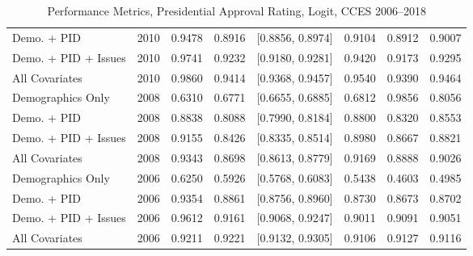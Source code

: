 \begin{table}[ht]
\begin{tabular}{lrrrlrrr}
  Demo. + PID & 2010 & 0.9478 & 0.8916 & [0.8856, 0.8974] & 0.9104 & 0.8912 & 0.9007 \\ 
  Demo. + PID + Issues & 2010 & 0.9741 & 0.9232 & [0.9180, 0.9281] & 0.9420 & 0.9173 & 0.9295 \\ 
  All Covariates & 2010 & 0.9860 & 0.9414 & [0.9368, 0.9457] & 0.9540 & 0.9390 & 0.9464 \\ 
  Demographics Only & 2008 & 0.6310 & 0.6771 & [0.6655, 0.6885] & 0.6812 & 0.9856 & 0.8056 \\ 
  Demo. + PID & 2008 & 0.8838 & 0.8088 & [0.7990, 0.8184] & 0.8800 & 0.8320 & 0.8553 \\ 
  Demo. + PID + Issues & 2008 & 0.9155 & 0.8426 & [0.8335, 0.8514] & 0.8980 & 0.8667 & 0.8821 \\ 
  All Covariates & 2008 & 0.9343 & 0.8698 & [0.8613, 0.8779] & 0.9169 & 0.8888 & 0.9026 \\ 
  Demographics Only & 2006 & 0.6250 & 0.5926 & [0.5768, 0.6083] & 0.5438 & 0.4603 & 0.4985 \\ 
  Demo. + PID & 2006 & 0.9354 & 0.8861 & [0.8756, 0.8960] & 0.8730 & 0.8673 & 0.8702 \\ 
  Demo. + PID + Issues & 2006 & 0.9612 & 0.9161 & [0.9068, 0.9247] & 0.9011 & 0.9091 & 0.9051 \\ 
  All Covariates & 2006 & 0.9211 & 0.9221 & [0.9132, 0.9305] & 0.9106 & 0.9127 & 0.9116 \\ 
   \bottomrule
\end{tabular}
\caption{Performance Metrics, Presidential Approval Rating, Logit, CCES 2006--2018} 
\label{tab:cces_presapprov_logit}
\end{table}
